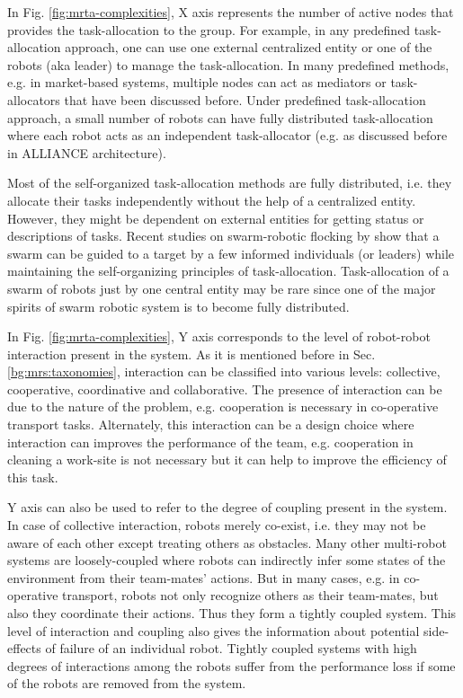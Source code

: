 In Fig. \ref{fig:mrta-complexities}, X axis represents the number of active nodes that provides the task-allocation to the group. For example, in any predefined  task-allocation approach, one can use one external centralized entity or one of the robots (aka leader) to manage the task-allocation. In many predefined methods, e.g. in market-based systems,  multiple nodes can act as mediators or task-allocators that have been discussed before. Under predefined task-allocation approach,  a small number of robots can have fully distributed task-allocation where each robot acts as an independent task-allocator (e.g. as discussed before in ALLIANCE architecture). 

Most of the self-organized task-allocation methods are fully distributed, i.e. they allocate their tasks independently without the help of a centralized entity. However, they might be dependent on external entities for getting status or descriptions of tasks. Recent studies on swarm-robotic flocking by  show that a swarm can be guided to a target by a few informed individuals (or leaders) while  maintaining the self-organizing principles of task-allocation. Task-allocation of a swarm of robots  just by one central entity may be rare since one of the major spirits of swarm robotic system is to become fully distributed.

In Fig. \ref{fig:mrta-complexities},  Y axis corresponds to the level of robot-robot interaction present in the system. As it is mentioned before in Sec. \ref{bg:mrs:taxonomies}, interaction can be classified into various levels: collective, cooperative, coordinative and collaborative. The presence of interaction can be due to the nature of the problem, e.g. cooperation is necessary in co-operative transport tasks. Alternately, this interaction can be a design choice where interaction can improves the performance of the team, e.g. cooperation in cleaning a work-site is not necessary but it can help to improve the  efficiency of this task. 

Y axis can also be used to refer to the degree of coupling present in the system.  In case of collective interaction, robots merely co-exist, i.e.  they may not be aware of each other except treating others as obstacles. Many other multi-robot systems are loosely-coupled where robots can indirectly infer some states of the environment from their team-mates' actions.  But in many cases, e.g. in  co-operative transport, robots not only recognize others as their team-mates, but also they coordinate their actions. Thus they form a  tightly coupled system. This level of interaction and coupling also gives the information about potential side-effects of failure of an individual robot. Tightly coupled systems with high degrees of interactions among the robots  suffer from the performance loss if some of the robots are removed from the system.

